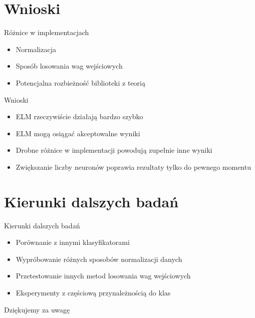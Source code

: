\documentclass{beamer}
\begin{document}
\section{Wnioski}
\begin{frame}{Różnice w implementacjach}
\begin{itemize}
\item Normalizacja
\item Sposób losowania wag wejściowych
\item Potencjalna rozbieżność biblioteki z teorią
\end{itemize}
\end{frame}

\begin{frame}{Wnioski}
\begin{itemize}
\item ELM rzeczywiście działają bardzo szybko
\item ELM mogą osiągać akceptowalne wyniki
\item Drobne różnice w implementacji powodują zupełnie inne wyniki
\item Zwiększanie liczby neuronów poprawia rezultaty tylko do pewnego momentu
\end{itemize}
\end{frame}

\section{Kierunki dalszych badań}
\begin{frame}{Kierunki dalszych badań}
\begin{itemize}
\item Porównanie z innymi klasyfikatorami
\item Wypróbowanie różnych sposobów normalizacji danych
\item Przetestowanie innych metod losowania wag wejściowych
\item Eksperymenty z częściową przynależnością do klas
\end{itemize}
\end{frame}

\begin{frame}
\begin{center}
\huge{Dziękujemy za uwagę}
\end{center}
\end{frame}
\end{document}
